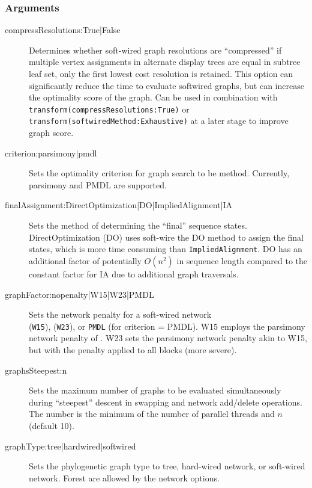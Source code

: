 	\subsubsection{Arguments}
		\begin{description}
			\item[compressResolutions:True|False] %
			Determines whether soft-wired graph 
			resolutions are ``compressed'' if multiple vertex assignments in alternate display 
			trees are equal in subtree leaf set, only the first lowest cost resolution is retained.
			This option can significantly reduce the time to evaluate softwired graphs, but can
			increase the optimality score of the graph.  Can be used in combination with
			\texttt{transform(compressResolutions:True)} or \texttt{transform(softwiredMethod:Exhaustive)} 
			at a later stage to improve graph score.
			
			\item[criterion:parsimony|pmdl] Sets the optimality criterion for graph search to be 
			method. Currently, parsimony and PMDL \citep{WheelerandVaron2022} are supported.
			
			\item[finalAssignment:DirectOptimization|DO|ImpliedAlignment|IA] Sets the method 
			of determining the ``final'' sequence states. DirectOptimization (DO) uses soft-wire the DO 
			method to assign the final states, which is more time consuming than \texttt{ImpliedAlignment}. 
			DO has an additional factor of potentially $O(n^2)$ in sequence length compared 
			to the constant factor for IA due to additional graph traversals.
			
			\item[graphFactor:nopenalty|W15|W23|PMDL] Sets the network penalty for a soft-wired network\\ 
			(\texttt{W15}),  (\texttt{W23}), or \texttt{PMDL} (for criterion = PMDL). W15 employs the
			parsimony network penalty of \cite{Wheeler2015}. W23 sets the parsimony network penalty akin to
			W15, but with the penalty applied to all blocks (more severe).
			
			\item[graphsSteepest:n] Sets the maximum number of graphs to be evaluated simultaneously during ``steepest'' descent 
			in swapping and network add/delete operations. The number is the minimum of the number of parallel threads and $n$
			(default 10).
			
			\item[graphType:tree|hardwired|softwired] Sets the phylogenetic graph type to tree, 
			hard-wired network, or soft-wired network. Forest are allowed by the network options.
			

\end{description}
